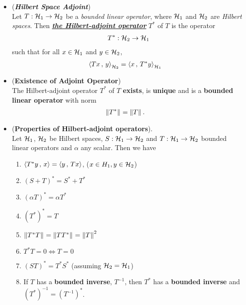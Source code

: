 \documentclass[11pt]{article}
\begin{document}
\begin{itemize}
\item \begin{definition} (\emph{\textbf{Hilbert Space Adjoint}})\\
Let $T: {\mathcal H}_{1} \rightarrow {\mathcal H}_{2}$ be a \emph{bounded linear operator}, where ${\mathcal H}_1$ and ${\mathcal H}_2$ are \emph{Hilbert spaces}. Then \underline{\emph{\textbf{the Hilbert-adjoint operator}}} $T^{*}$ of $T$ is the operator
\begin{align*}
T^{*}: {\mathcal H}_2 \rightarrow {\mathcal H}_1
\end{align*} such that for all $x \in {\mathcal H}_1$ and $y \in {\mathcal H}_2$,
\begin{align}
\left\langle Tx\,,\, y \right\rangle_{{\mathcal H}_2} &= \left\langle x\,,\, T^{*}y \right\rangle_{{\mathcal H}_1} \label{eqn: hilbert_space_adjoint}
\end{align}
\end{definition}

\item \begin{proposition} (\textbf{Existence of Adjoint Operator}) \citep{kreyszig1989introductory}\\
The Hilbert-adjoint operator $T^{*}$ of $T$ \textbf{exists}, is \textbf{unique} and is a \textbf{bounded linear operator} with norm
\begin{align*}
\left\|T^{*}\right\|_{} &= \left\|T\right\|_{}.
\end{align*}
\end{proposition}

\item \begin{proposition} (\textbf{Properties of Hilbert-adjoint operators}).  \citep{reed1980methods, kreyszig1989introductory}\\
Let ${\mathcal H}_1$, ${\mathcal H}_2$ be Hilbert spaces, $S: {\mathcal H}_1 \rightarrow {\mathcal H}_2$ and $T: {\mathcal H}_1 \rightarrow {\mathcal H}_2$ bounded linear operators and $\alpha$ any scalar. Then we have
\begin{enumerate}
\item $\left\langle T^{*}y\,,\, x \right\rangle = \left\langle y\,,\, Tx \right\rangle$,  ($x \in H_1,  y \in {\mathcal H}_2$)
\item $ (S + T)^{*} = S^{*} + T^{*}$
\item $(\alpha T)^{*} = \alpha T^{*}$
\item $(T^{*})^{*} = T$
\item $\left\|T^{*}T\right\|_{} = \left\|TT^{*}\right\|_{} = \left\|T\right\|_{}^2$
\item $T^{*}T =0 \Leftrightarrow T=0$
\item $(ST)^{*}= T^{*}S^{*}$  (assuming ${\mathcal H}_2 = {\mathcal H}_1$)
\item If $T$ has a \textbf{bounded inverse},  $T^{-1}$, then $T^*$ has a \textbf{bounded inverse} and $(T^{*})^{-1} = (T^{-1})^{*}$.
\end{enumerate}
\end{proposition}


\end{itemize}
\end{document}
